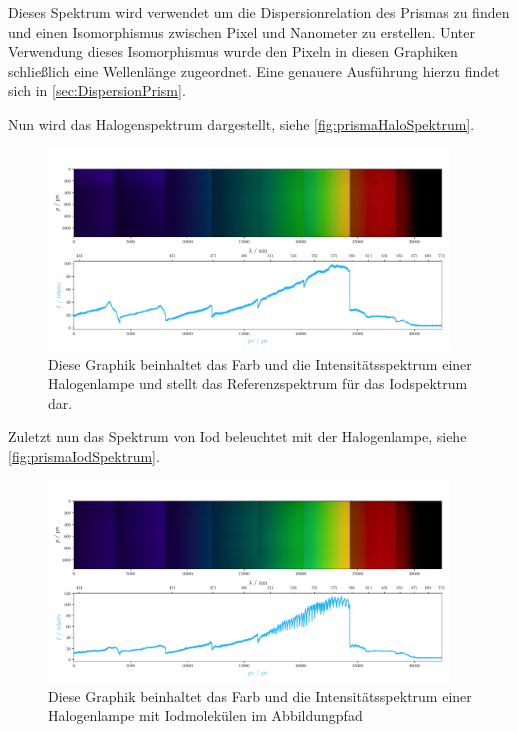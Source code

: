 \documentclass[12pt,english,ngerman]{scrartcl}
\begin{document}
Dieses Spektrum wird verwendet um die Dispersionrelation des Prismas zu finden
und einen Isomorphismus zwischen Pixel und Nanometer zu erstellen. Unter
Verwendung dieses Isomorphismus wurde den Pixeln in diesen Graphiken schließlich eine
Wellenlänge zugeordnet. Eine genauere Ausführung hierzu findet sich in \autoref{sec:DispersionPrism}.

Nun wird das Halogenspektrum dargestellt, siehe
\autoref{fig:prismaHaloSpektrum}. 
\begin{figure}[H]
	\begin{center}
		\includegraphics[width=0.95\textwidth]{figures/Halo_plot.pdf}
	\end{center}
	\caption{
		Diese Graphik beinhaltet das Farb und die Intensitätsspektrum einer
		Halogenlampe und stellt das Referenzspektrum für das Iodspektrum dar. 
	}\label{fig:prismaHaloSpektrum}
\end{figure}

Zuletzt nun das Spektrum von Iod beleuchtet mit der Halogenlampe, siehe
\autoref{fig:prismaIodSpektrum}.

\begin{figure}[H]
	\begin{center}
		\includegraphics[width=0.95\textwidth]{figures/I_plot.pdf}
	\end{center}
	\caption{Diese Graphik beinhaltet das Farb und die Intensitätsspektrum einer
		Halogenlampe mit Iodmolekülen im Abbildungpfad
	}\label{fig:prismaIodSpektrum}
\end{figure}
\end{document}
